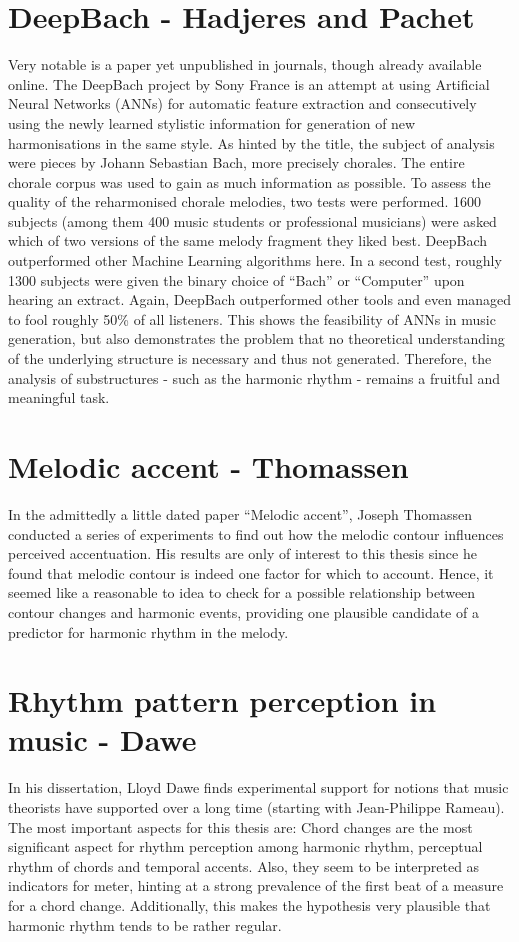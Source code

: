\documentclass[a4paper,12pt]{report}
\begin{document}
\section{DeepBach - Hadjeres and Pachet}
\cite{hadjeres2016deepbach}
Very notable is a paper yet unpublished in
journals, though already available online. The DeepBach project by Sony France is an
attempt at using Artificial Neural Networks (ANNs) for automatic feature extraction and consecutively
using the newly learned stylistic information for generation of new harmonisations in the same style. As
hinted by the title, the subject of analysis were pieces by Johann Sebastian Bach, more precisely
chorales. The entire chorale corpus was used to gain as much information as possible. To assess the
quality of the reharmonised chorale melodies, two tests were performed. 1600 subjects (among them
400 music students or professional musicians) were asked which of two versions of the same melody
fragment they liked best. DeepBach outperformed other Machine Learning algorithms here. In a second
test, roughly 1300 subjects were given the binary choice of ``Bach'' or ``Computer'' upon hearing an
extract. Again, DeepBach outperformed other tools and even managed to fool roughly 50\% of all
listeners. This shows the feasibility of ANNs in music generation, but also demonstrates the problem that
no theoretical understanding of the underlying structure is necessary and thus not generated. Therefore,
the analysis of substructures - such as the harmonic rhythm - remains a fruitful and meaningful task.

\section{Melodic accent - Thomassen}
\cite{thomassen1982melodic}
In the admittedly a little dated paper ``Melodic accent'', Joseph Thomassen conducted a series of
experiments to find out how the melodic contour influences perceived accentuation. His results are only
of interest to this thesis since he found that melodic contour is indeed one factor for which to account.
Hence, it seemed like a reasonable to idea to check for a possible relationship between contour changes
and harmonic events, providing one plausible candidate of a predictor for harmonic rhythm in the melody.

\section{Rhythm pattern perception in music - Dawe}
\cite{dawe1993rhythm}
In his dissertation, Lloyd Dawe finds experimental support for notions that music theorists have supported
over a long time (starting with Jean-Philippe Rameau). The most important aspects for this thesis are:
Chord changes are the most significant aspect for rhythm perception among harmonic
rhythm, perceptual rhythm of chords and temporal accents. Also, they seem to be interpreted as
indicators for meter, hinting at a strong prevalence of the first beat of a measure for a chord
change. Additionally, this makes the hypothesis very plausible that harmonic rhythm tends to be rather
regular.
\end{document}
